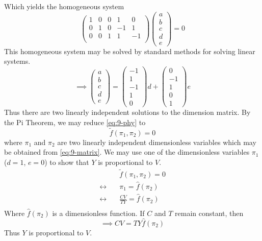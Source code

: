\documentclass[12pt,twoside]{article}
\begin{document}
  Which yields the homogeneous system
  \begin{equation*}
    \begin{pmatrix}
      1 & 0 & 0 & 1 & 0 \\
      0 & 1 & 0 & -1 & 1 \\
      0 & 0 & 1 & 1 & -1 \\
    \end{pmatrix}
    \begin{pmatrix}
      a \\ b \\ c \\ d \\ e
    \end{pmatrix} = 0
  \end{equation*}
  This homogeneous system may be solved by standard methods for solving linear
  systems.
  \begin{equation}
    \label{eq:9-matrix}
    \implies
    \begin{pmatrix}
      a \\ b \\ c \\ d \\ e
    \end{pmatrix}
    =
    \begin{pmatrix}
      -1 \\ 1 \\ -1 \\ 1 \\ 0
    \end{pmatrix}d +
    \begin{pmatrix}
      0 \\ -1 \\ 1 \\ 0 \\ 1
    \end{pmatrix}e
  \end{equation}
  Thus there are two linearly independent solutions to the dimension matrix.
  By the Pi Theorem, we may reduce \cref{eq:9-phy} to
  \begin{equation}
    \tilde{f}(\pi_1, \pi_2) = 0
  \end{equation}
  where $\pi_1$ and $\pi_2$ are two linearly independent dimensionless variables
  which may be obtained from \cref{eq:9-matrix}. We may use one of the
  dimensionless variables $\pi_1$ ($d=1$, $e=0$) to show that $Y$ is
  proportional to $V$.
  \begin{equation*}
    \begin{aligned}
      &\tilde{f}(\pi_1,\pi_2)= 0 \\
      \leftrightarrow\quad& \pi_1 = \hat{f}(\pi_2) \\
      \leftrightarrow\quad& \frac{CV}{TY} = \hat{f}(\pi_2) \\
    \end{aligned}
  \end{equation*}
  Where $\hat{f}(\pi_2)$ is a dimensionless function. If $C$ and $T$ remain
  constant, then
  \begin{equation}
    \label{eq:9-prop}
    \boxed{
      \implies CV = TY\hat{f}(\pi_2)
    }
  \end{equation}
  Thus $Y$ is proportional to $V$.
\end{document}
